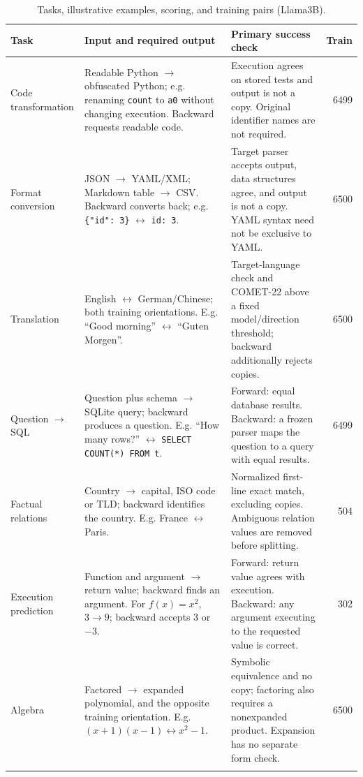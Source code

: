 \begin{table}[t]
\centering\small
\setlength{\tabcolsep}{4pt}
\begin{tabular}{p{}p{}p{}r}
\toprule
Task & Input and required output & Primary success check & Train \\
\midrule
Code transformation & Readable Python $\to$ obfuscated Python; e.g. renaming \texttt{count} to \texttt{a0} without changing execution. Backward requests readable code. & Execution agrees on stored tests and output is not a copy. Original identifier names are not required. & 6499 \\
\addlinespace[3pt]
Format conversion & JSON $\to$ YAML/XML; Markdown table $\to$ CSV. Backward converts back; e.g. \texttt{\{"id": 3\}} $\leftrightarrow$ \texttt{id: 3}. & Target parser accepts output, data structures agree, and output is not a copy. YAML syntax need not be exclusive to YAML. & 6500 \\
\addlinespace[3pt]
Translation & English $\leftrightarrow$ German/Chinese; both training orientations. E.g. ``Good morning'' $\leftrightarrow$ ``Guten Morgen''. & Target-language check and COMET-22 above a fixed model/direction threshold; backward additionally rejects copies. & 6500 \\
\addlinespace[3pt]
Question $\to$ SQL & Question plus schema $\to$ SQLite query; backward produces a question. E.g. ``How many rows?'' $\leftrightarrow$ \texttt{SELECT COUNT(*) FROM t}. & Forward: equal database results. Backward: a frozen parser maps the question to a query with equal results. & 6499 \\
\addlinespace[3pt]
Factual relations & Country $\to$ capital, ISO code or TLD; backward identifies the country. E.g. France $\leftrightarrow$ Paris. & Normalized first-line exact match, excluding copies. Ambiguous relation values are removed before splitting. & 504 \\
\addlinespace[3pt]
Execution prediction & Function and argument $\to$ return value; backward finds an argument. For $f(x)=x^2$, $3\to9$; backward accepts $3$ or $-3$. & Forward: return value agrees with execution. Backward: any argument executing to the requested value is correct. & 302 \\
\addlinespace[3pt]
Algebra & Factored $\to$ expanded polynomial, and the opposite training orientation. E.g. $(x+1)(x-1)\leftrightarrow x^2-1$. & Symbolic equivalence and no copy; factoring also requires a nonexpanded product. Expansion has no separate form check. & 6500 \\
\addlinespace[3pt]
\bottomrule
\end{tabular}
\caption{Tasks, illustrative examples, scoring, and training pairs (Llama3B).}\label{tab:task-definitions}
\end{table}
